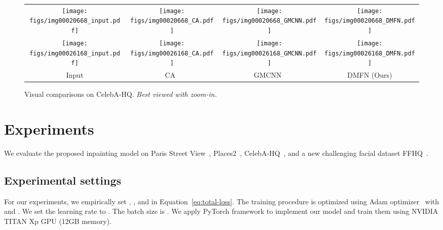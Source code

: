 \documentclass[journal]{IEEEtran}
\begin{document}
\begin{figure}[htpb]
	\centering
	\begin{adjustbox}{valign=t}
		\begin{tabular}{cccc}
			\texttt{[image: figs/img00020668\_input.pdf]} &
			\hspace{-4mm}
			\texttt{[image: figs/img00020668\_CA.pdf]} &
			\hspace{-4mm}
			\texttt{[image: figs/img00020668\_GMCNN.pdf]} &
			\hspace{-4mm}
			\texttt{[image: figs/img00020668\_DMFN.pdf]} \\
			
			
			\texttt{[image: figs/img00026168\_input.pdf]} &
			\hspace{-4mm}
			\texttt{[image: figs/img00026168\_CA.pdf]} &
			\hspace{-4mm}
			\texttt{[image: figs/img00026168\_GMCNN.pdf]} &
			\hspace{-4mm}
			\texttt{[image: figs/img00026168\_DMFN.pdf]} \\
			
			Input &\hspace{-4mm} CA~\cite{contextual-attention} &\hspace{-4mm} GMCNN~\cite{GMCNN} &\hspace{-4mm} DMFN (Ours) \\
		\end{tabular}
	\end{adjustbox}
	\caption{Visual comparisons on CelebA-HQ. \textit{Best viewed with zoom-in.}}
	\label{fig:celeba-hq}
\end{figure}

\section{Experiments}\label{sec:experiments}
We evaluate the proposed inpainting model on Paris Street View~\cite{CE}, Places2~\cite{places2}, CelebA-HQ~\cite{celeba-hq}, and a new challenging facial dataset FFHQ~\cite{ffhq}.

\subsection{Experimental settings}
For our experiments, we empirically set , ,  and  in Equation~\ref{eq:total-loss}. The training procedure is optimized using Adam optimizer~\cite{Adam} with  and . We set the learning rate to . The batch size is . We apply PyTorch framework to implement our model and train them using NVIDIA TITAN Xp GPU (12GB memory). 
\end{document}
